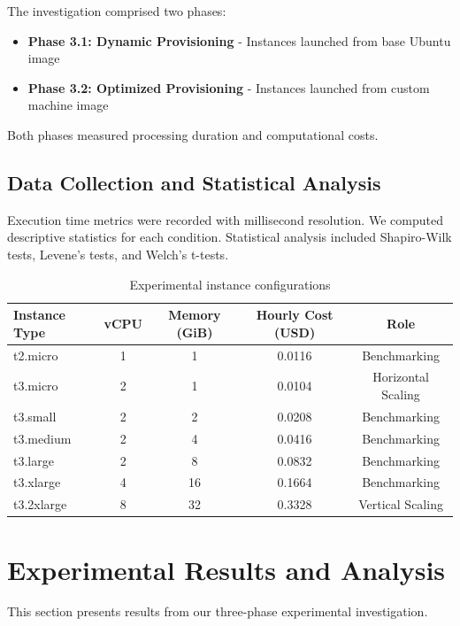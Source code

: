 \documentclass[conference]{IEEEtran}
\begin{document}
	The investigation comprised two phases:
	\begin{itemize}
		\item \textbf{Phase 3.1: Dynamic Provisioning} - Instances launched from base Ubuntu image
		\item \textbf{Phase 3.2: Optimized Provisioning} - Instances launched from custom machine image
	\end{itemize}
	
	Both phases measured processing duration and computational costs.
	
	\subsection{Data Collection and Statistical Analysis}
	\label{data-collection-and-storage}
	
	Execution time metrics were recorded with millisecond resolution. We computed descriptive statistics for each condition. Statistical analysis included Shapiro-Wilk tests, Levene's tests, and Welch's t-tests.
	
	\begin{table}[t]
		\centering
		\caption{Experimental instance configurations}
		\label{tab:experimental_configurations}
		\begin{tabular}{|l|c|c|c|c|}
			\hline
			\textbf{Instance Type} & \textbf{vCPU} & \textbf{Memory (GiB)} & \textbf{Hourly Cost (USD)} & \textbf{Role} \\
			\hline
			t2.micro & 1 & 1 & 0.0116 & Benchmarking \\
			t3.micro & 2 & 1 & 0.0104 & Horizontal Scaling \\
			t3.small & 2 & 2 & 0.0208 & Benchmarking \\
			t3.medium & 2 & 4 & 0.0416 & Benchmarking \\
			t3.large & 2 & 8 & 0.0832 & Benchmarking \\
			t3.xlarge & 4 & 16 & 0.1664 & Benchmarking \\
			t3.2xlarge & 8 & 32 & 0.3328 & Vertical Scaling \\
			\hline
		\end{tabular}
	\end{table}
	
	\section{Experimental Results and Analysis}
	\label{experiments}
	
	This section presents results from our three-phase experimental investigation.
	
\end{document}
